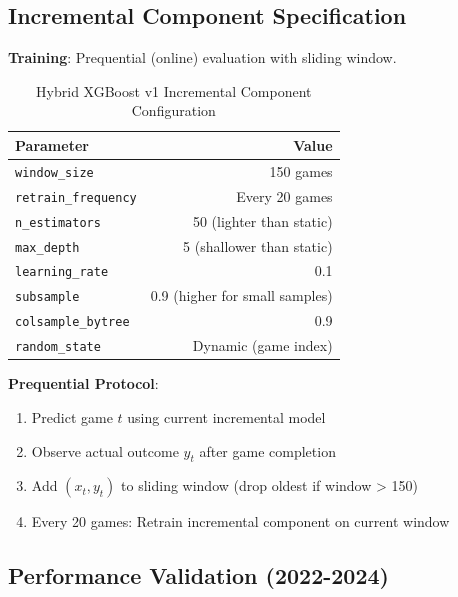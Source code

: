 \subsection{Incremental Component Specification}

\textbf{Training}: Prequential (online) evaluation with sliding window.

\begin{table}[h]
\centering
\caption{Hybrid XGBoost v1 Incremental Component Configuration}
\label{tab:hybrid-incremental-config}
\begin{tabular}{lr}
\toprule
\textbf{Parameter} & \textbf{Value} \\
\midrule
\texttt{window\_size} & 150 games \\
\texttt{retrain\_frequency} & Every 20 games \\
\texttt{n\_estimators} & 50 (lighter than static) \\
\texttt{max\_depth} & 5 (shallower than static) \\
\texttt{learning\_rate} & 0.1 \\
\texttt{subsample} & 0.9 (higher for small samples) \\
\texttt{colsample\_bytree} & 0.9 \\
\texttt{random\_state} & Dynamic (game index) \\
\bottomrule
\end{tabular}
\end{table}

\textbf{Prequential Protocol}:
\begin{enumerate}
\item Predict game $t$ using current incremental model
\item Observe actual outcome $y_t$ after game completion
\item Add $(x_t, y_t)$ to sliding window (drop oldest if window > 150)
\item Every 20 games: Retrain incremental component on current window
\end{enumerate}

\subsection{Performance Validation (2022-2024)}

